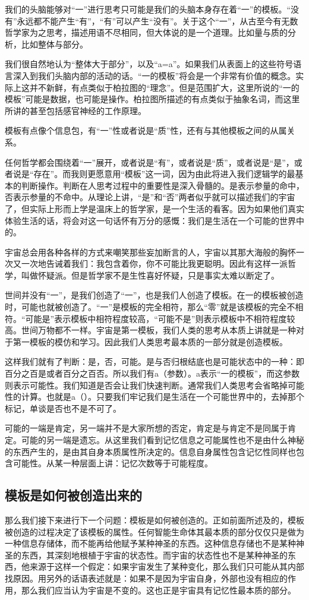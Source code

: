 \documentclass[12pt]{exam}%
\begin{document}
我们的头脑能够对“一”进行思考只可能是我们的头脑本身存在着“一”的模板。“没有”永远都不能产生“有”，“有”可以产生“没有”。关于这个“一”，从古至今有无数哲学家为之思考，描述用语不尽相同，但大体说的是一个道理。比如量与质的分析，比如整体与部分。

我们很自然地认为“整体大于部分”，以及“a=a”。如果我们从表面上的这些符号语言深入到我们头脑内部的活动的话。“一的模板”将会是一个非常有价值的概念。实际上这并不新鲜，有点类似于柏拉图的“理念”。但是范围扩大，这里所说的“一的模板”可能是数据，也可能是操作。柏拉图所描述的有点类似于抽象名词，而这里所讲的甚至包括感官神经的工作原理。

模板有点像个信息包，有“一”性或者说是“质”性，还有与其他模板之间的从属关系。

任何哲学都会围绕着“一”展开，或者说是“有”，或者说是“质”，或者说是“是”，或者说是“存在”。而我则更愿意用“模板”这一词，因为由此将进入我们逻辑学的最基本的判断操作。判断在人思考过程中的重要性是深入骨髓的。是表示参量的命中，否表示参量的不命中。从理论上讲，“是”和“否”两者似乎就可以描述我们的宇宙了，但实际上形而上学是温床上的哲学家，是一个生活的看客。因为如果他们真实体验生活的话，将会对这一句话怀有万分的感慨：我们是生活在一个可能的世界中的。

宇宙总会用各种各样的方式来嘲笑那些妄加断言的人，宇宙以其那大海般的胸怀一次又一次地告诫着我们：我包含着你，你不可能比我更聪明。因此有这样一派哲学，叫做怀疑派。但是哲学家不是生性喜好怀疑，只是事实太难以断定了。

世间并没有“一”，是我们创造了“一”，也是我们人创造了模板。在一的模板被创造时，可能也就被创造了。“一”是模板的完全相符，那么“零”就是该模板的完全不相符。“可能是”表示模板中相符程度较高，“可能不是”则表示模板中不相符程度较高。世间万物都不一样。宇宙是第一模板，我们人类的思考从本质上讲就是一种对于第一模板的模仿和学习。因此我们人类思考最本质的一部分就是创造模板。

这样我们就有了判断：是，否，可能。是与否归根结底也是可能状态中的一种：即百分之百是或者百分之百否。所以我们有a（参数）。a表示“一的模板”，而这参数则表示可能性。我们知道是否会让我们快速判断。通常我们人类思考会省略掉可能性的计算。也就是a（）。只要我们牢记我们是生活在一个可能世界中的，去掉那个标记，单谈是否也不是不可了。

可能的一端是肯定，另一端并不是大家所想的否定，肯定是与肯定不是同属于肯定。可能的另一端是遗忘。从这里我们看到记忆信息之可能属性也不是由什么神秘的东西产生的，是由其自身本质属性所决定的。信息自身属性包含记忆性同样也包含可能性。从某一种层面上讲：记忆次数等于可能程度。
    

\subsection{模板是如何被创造出来的}
那么我们接下来进行下一个问题：模板是如何被创造的。正如前面所述及的，模板被创造的过程决定了该模板的属性。任何智能生命体其最本质的部分仅仅只是做为一种信息存储体，而不能再给他赋予某种神圣的东西。这种信息存储也不是某种神圣的东西，其深刻地根植于宇宙的状态性。而宇宙的状态性也不是某种神圣的东西，他来源于这样一个假定：如果宇宙发生了某种变化，那么我们只可能从其内部找原因。用另外的话语表述就是：如果不是因为宇宙自身，外部也没有相应的作用，那么我们应当认为宇宙是不变的。这也正是宇宙具有记忆性最本质的部分。
\end{document}

